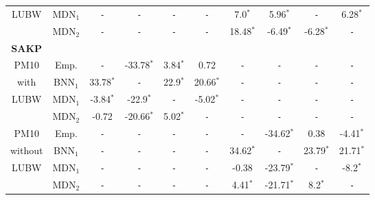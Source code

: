 \begin{tabular}{c|c|cccc||cccc}
  LUBW&MDN$_1$&\texttt{\--}&\texttt{\--}&\texttt{\--}&\texttt{\--}&7.0$^*$&5.96$^*$&\texttt{\--}&6.28$^*$ \\ 
  &MDN$_2$&\texttt{\--}&\texttt{\--}&\texttt{\--}&\texttt{\--}&18.48$^*$&-6.49$^*$&-6.28$^*$&\texttt{\--} \\ 
  \hline     
  \hline     
\textbf{SAKP}&&&&&&& \\ 
  PM10&Emp.&\texttt{\--}&-33.78$^*$&3.84$^*$&0.72&\texttt{\--}&\texttt{\--}&\texttt{\--}&\texttt{\--} \\ 
  with&BNN$_1$&33.78$^*$&\texttt{\--}&22.9$^*$&20.66$^*$&\texttt{\--}&\texttt{\--}&\texttt{\--}&\texttt{\--} \\ 
  LUBW&MDN$_1$&-3.84$^*$&-22.9$^*$&\texttt{\--}&-5.02$^*$&\texttt{\--}&\texttt{\--}&\texttt{\--}&\texttt{\--} \\ 
  &MDN$_2$&-0.72&-20.66$^*$&5.02$^*$&\texttt{\--}&\texttt{\--}&\texttt{\--}&\texttt{\--}&\texttt{\--} \\ 
  \hline     
  PM10&Emp.&\texttt{\--}&\texttt{\--}&\texttt{\--}&\texttt{\--}&\texttt{\--}&-34.62$^*$&0.38&-4.41$^*$ \\ 
  without&BNN$_1$&\texttt{\--}&\texttt{\--}&\texttt{\--}&\texttt{\--}&34.62$^*$&\texttt{\--}&23.79$^*$&21.71$^*$ \\ 
  LUBW&MDN$_1$&\texttt{\--}&\texttt{\--}&\texttt{\--}&\texttt{\--}&-0.38&-23.79$^*$&\texttt{\--}&-8.2$^*$ \\ 
  &MDN$_2$&\texttt{\--}&\texttt{\--}&\texttt{\--}&\texttt{\--}&4.41$^*$&-21.71$^*$&8.2$^*$&\texttt{\--} \\ 
  \hline     
  \hline     
\end{tabular} 
